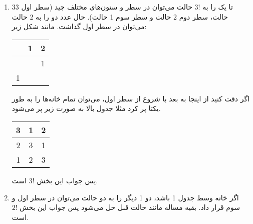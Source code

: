 \begin{enumerate}
    \item
        3تا یک را به 
	$3!$
	حالت می‌توان در سطر و ستون‌های مختلف چید
	(سطر اول 3 حالت، سطر دوم 2 حالت و سطر سوم 1 حالت).
	حال عدد دو را به 2 حالت می‌توان در سطر اول گذاشت. مانند شکل زیر:
	
	 \begin{center}
	\begin{tabular}{ |c|c|c| } 
     \hline
       & 1 & 2  \\ 
     \hline
       &   & 1 \\ 
     \hline
     1 &  &   \\ 
     \hline
    \end{tabular}
    \end{center}
    اگر دقت کنید از اینجا به بعد با شروع از سطر اول، می‌توان تمام خانه‌ها را به طور یکتا پر کرد مثلا جدول بالا به صورت زیر پر می‌شود.
    
    \begin{center}
	\begin{tabular}{ |c|c|c| } 
     \hline
      3 & 1 & 2 \\ 
     \hline
      2 & 3 & 1 \\ 
     \hline
      1 & 2 & 3 \\ 
     \hline
    \end{tabular}
    \end{center}
    پس جواب این بخش
    $3!$ 
    است.
    
    \item
    اگر خانه وسط جدول 1 باشد، دو 1 دیگر را به دو حالت می‌توان در سطر اول و سوم قرار داد. بقیه مساله مانند حالت قبل حل می‌شود پس جواب این بخش 
    $2!$ است.
    \end{enumerate}